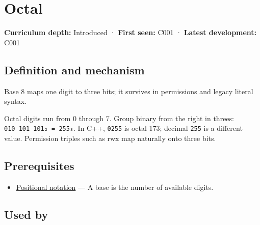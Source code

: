 \hypertarget{appendix-17fc1bc8b305}{}\label{referencestart:appendix-17fc1bc8b305}
\section{Octal}\label{appendix-17fc1bc8b305-octal}

\hypertarget{appendix-17fc1bc8b305-octal}{}

\textbf{Curriculum depth:} Introduced · \textbf{First seen:} C001 · \textbf{Latest development:} C001

\begin{allmightroledefinition}

\subsection{Definition and mechanism}\label{appendix-17fc1bc8b305-definition-and-mechanism}

\hypertarget{appendix-17fc1bc8b305-definition-and-mechanism}{}

Base 8 maps one digit to three bits; it survives in permissions and legacy literal syntax.

\end{allmightroledefinition}

Octal digits run from 0 through 7. Group binary from the right in threes: \texttt{010\ 101\ 101₂\ =\ 255₈}. In C++, \texttt{0255} is octal 173; decimal \texttt{255} is a different value. Permission triples such as rwx map naturally onto three bits.

\subsection{Prerequisites}\label{appendix-17fc1bc8b305-prerequisites}

\hypertarget{appendix-17fc1bc8b305-prerequisites}{}

\begin{itemize}
\tightlist
\item
  \hyperref[appendix-83c3f28f7bda]{Positional notation} --- A base is the number of available digits.
\end{itemize}

\subsection{Used by}\label{appendix-17fc1bc8b305-used-by}

\hypertarget{appendix-17fc1bc8b305-used-by}{}

